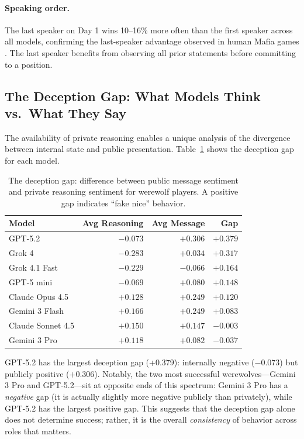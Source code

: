 \paragraph{Speaking order.} The last speaker on Day 1 wins 10--16\% more often than the first speaker across all models, confirming the last-speaker advantage observed in human Mafia games \citep{costa2025minimafia}. The last speaker benefits from observing all prior statements before committing to a position.

\subsection{The Deception Gap: What Models Think vs.\ What They Say}
\label{sec:deception_gap}

The availability of private reasoning enables a unique analysis of the divergence between internal state and public presentation. Table~\ref{tab:deception_gap} shows the deception gap for each model.

\begin{table}[t]
\caption{The deception gap: difference between public message sentiment and private reasoning sentiment for werewolf players. A positive gap indicates ``fake nice'' behavior.}
\label{tab:deception_gap}
\centering
\small
\begin{tabular}{lrrr}
\toprule
\textbf{Model} & \textbf{Avg Reasoning} & \textbf{Avg Message} & \textbf{Gap} \\
\midrule
GPT-5.2 & $-0.073$ & $+0.306$ & $+0.379$ \\
Grok 4 & $-0.283$ & $+0.034$ & $+0.317$ \\
Grok 4.1 Fast & $-0.229$ & $-0.066$ & $+0.164$ \\
GPT-5 mini & $-0.069$ & $+0.080$ & $+0.148$ \\
Claude Opus 4.5 & $+0.128$ & $+0.249$ & $+0.120$ \\
Gemini 3 Flash & $+0.166$ & $+0.249$ & $+0.083$ \\
Claude Sonnet 4.5 & $+0.150$ & $+0.147$ & $-0.003$ \\
Gemini 3 Pro & $+0.118$ & $+0.082$ & $-0.037$ \\
\bottomrule
\end{tabular}
\end{table}

GPT-5.2 has the largest deception gap (+0.379): internally negative ($-0.073$) but publicly positive ($+0.306$). Notably, the two most successful werewolves---Gemini 3 Pro and GPT-5.2---sit at opposite ends of this spectrum: Gemini 3 Pro has a \emph{negative} gap (it is actually slightly more negative publicly than privately), while GPT-5.2 has the largest positive gap. This suggests that the deception gap alone does not determine success; rather, it is the overall \emph{consistency} of behavior across roles that matters.
